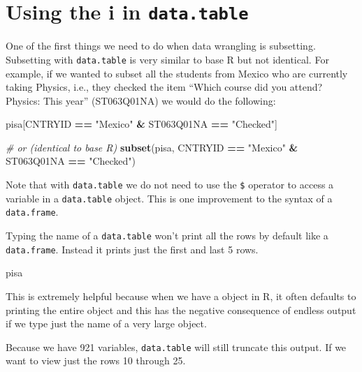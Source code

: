 \documentclass[]{book}
\newenvironment{Shaded}{\begin{snugshade}}{\end{snugshade}}
\newcommand{\CommentTok}[1]{\textcolor[rgb]{0.56,0.35,0.01}{\textit{#1}}}
\newcommand{\KeywordTok}[1]{\textcolor[rgb]{0.13,0.29,0.53}{\textbf{#1}}}
\newcommand{\NormalTok}[1]{#1}
\newcommand{\OperatorTok}[1]{\textcolor[rgb]{0.81,0.36,0.00}{\textbf{#1}}}
\newcommand{\StringTok}[1]{\textcolor[rgb]{0.31,0.60,0.02}{#1}}
\begin{document}
\hypertarget{using-the-i-in-data.table}{%
\section{\texorpdfstring{Using the i in \texttt{data.table}}{Using the i in data.table}}\label{using-the-i-in-data.table}}

One of the first things we need to do when data wrangling is subsetting. Subsetting with \texttt{data.table} is very similar to base R but not identical. For example, if we wanted to subset all the students from Mexico who are currently taking Physics, i.e., they checked the item ``Which course did you attend? Physics: This year'' (ST063Q01NA) we would do the following:

\begin{Shaded}
\begin{Highlighting}[]
\NormalTok{pisa[CNTRYID }\OperatorTok{==}\StringTok{ "Mexico"} \OperatorTok{&}\StringTok{ }\NormalTok{ST063Q01NA }\OperatorTok{==}\StringTok{ "Checked"}\NormalTok{]}

\CommentTok{# or (identical to base R)}
\KeywordTok{subset}\NormalTok{(pisa, CNTRYID }\OperatorTok{==}\StringTok{ "Mexico"} \OperatorTok{&}\StringTok{ }\NormalTok{ST063Q01NA }\OperatorTok{==}\StringTok{ "Checked"}\NormalTok{)}
\end{Highlighting}
\end{Shaded}

Note that with \texttt{data.table} we do not need to use the \texttt{\$} operator to access a variable in a \texttt{data.table} object. This is one improvement to the syntax of a \texttt{data.frame}.

Typing the name of a \texttt{data.table} won't print all the rows by default like a \texttt{data.frame}. Instead it prints just the first and last 5 rows.

\begin{Shaded}
\begin{Highlighting}[]
\NormalTok{pisa}
\end{Highlighting}
\end{Shaded}

This is extremely helpful because when we have a object in R, it often defaults to printing the entire object and this has the negative consequence of endless output if we type just the name of a very large object.

Because we have 921 variables, \texttt{data.table} will still truncate this output. If we want to view just the rows 10 through 25.
\end{document}
